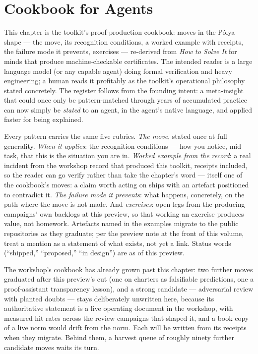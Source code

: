 \chapter{Cookbook for Agents}
\label{ch:mtk-cookbook}

\noindent\draftmark\medskip

This chapter is the toolkit's proof-production cookbook: moves in the
P\'olya shape --- the move, its recognition conditions, a worked example
with receipts, the failure mode it prevents, exercises --- re-derived
from \emph{How to Solve It} \cite{polya1945solve} for minds that
produce machine-checkable certificates. The intended reader is a large language model (or any
capable agent) doing formal verification and heavy engineering; a human
reads it profitably as the toolkit's operational philosophy stated
concretely. The register follows from the founding intent: a
meta-insight that could once only be pattern-matched through years of
accumulated practice can now simply be \emph{stated} to an agent, in
the agent's native language, and applied faster for being explained.

Every pattern carries the same five rubrics. \emph{The move}, stated
once at full generality. \emph{When it applies}: the recognition
conditions --- how you notice, mid-task, that this is the situation you
are in. \emph{Worked example from the record}: a real incident from the
workshop record that produced this toolkit, receipts included, so the
reader can go verify rather than take the chapter's word --- itself one
of the cookbook's moves: a claim worth acting on ships with an artefact
positioned to contradict it. \emph{The failure mode it prevents}: what
happens, concretely, on the path where the move is not made. And
\emph{exercises}: open legs from the producing campaigns' own backlogs
at this preview, so that working an exercise produces value, not
homework. Artefacts named in the examples migrate to the public
repositories as they graduate; per the preview note at the front of
this volume, treat a mention as a statement of what exists, not yet a
link. Status words (``shipped,'' ``proposed,'' ``in design'') are as of
this preview.

The workshop's cookbook has already grown past this chapter: two
further moves graduated after this preview's cut (one on charters as
falsifiable predictions, one a proof-assistant transparency lesson),
and a strong candidate --- adversarial review with planted doubts ---
stays deliberately unwritten here, because its authoritative statement
is a live operating document in the workshop, with measured hit rates
across the review campaigns that shaped it, and a book copy of a live
norm would drift from the norm. Each will be written from its receipts
when they migrate. Behind them, a harvest queue of roughly ninety
further candidate moves waits its turn.

